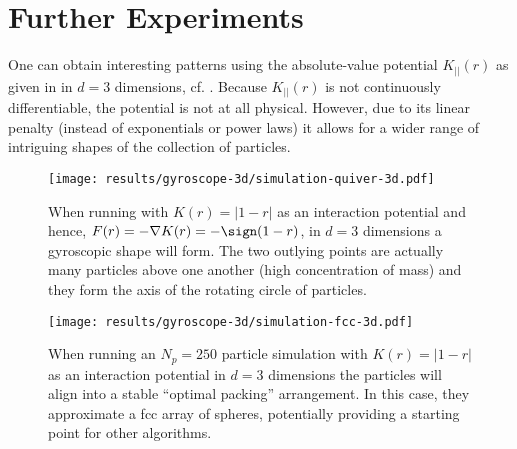 \section{Further Experiments}
One can obtain interesting patterns using the absolute-value potential $K_{||}(r)$ as given in  in $d=3$ dimensions, cf. .
Because $K_{||}(r)$ is not continuously differentiable, the potential is not at all physical.
However, due to its linear penalty (instead of exponentials or power laws) it allows for a wider range of intriguing shapes of the collection of particles.

\begin{figure}[H]
  \centering
  \texttt{[image: results/gyroscope-3d/simulation-quiver-3d.pdf]}
  \caption{When running with $K(r) = |1-r|$ as an interaction potential and hence, $F(r) = -\nabla K(r) = -\sign(1-r)$, in $d=3$ dimensions a gyroscopic shape will form. The two outlying points are actually many particles above one another (high concentration of mass) and they form the axis of the rotating circle of particles.}
  \label{fig:gyroscope-quiver-3d}
\end{figure}

\begin{figure}[H]
  \centering
  \texttt{[image: results/gyroscope-3d/simulation-fcc-3d.pdf]}
  \caption{When running an $N_p = 250$ particle simulation with $K(r) = |1-r|$ as an interaction potential in $d=3$ dimensions the particles will align into a stable ``optimal packing'' arrangement. In this case, they approximate a \gls{fcc} array of spheres, potentially providing a starting point for other algorithms.}
  \label{fig:fcc-quiver-3d}
\end{figure}

